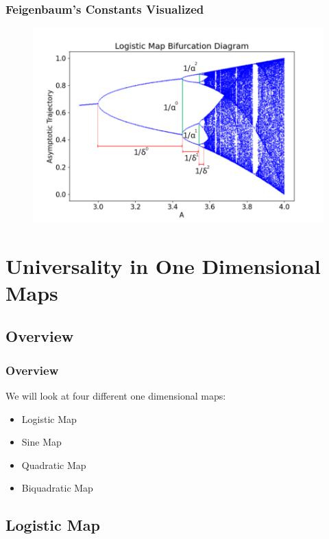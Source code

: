 \documentclass[
	11pt, %
	aspectratio=169, %
]{beamer}
\begin{document}

\begin{frame}
	\frametitle{Feigenbaum's Constants Visualized}
    \begin{figure}
        \includegraphics[width=0.6\linewidth]{plots/feigenbaum_constants_example.png}
    \end{figure}
\end{frame}


\section{Universality in One Dimensional Maps}
\subsection{Overview}

\begin{frame}
	\frametitle{Overview}

    We will look at four different one dimensional maps: \pause

    \begin{itemize}
        \item Logistic Map \pause
        \item Sine Map \pause
        \item Quadratic Map \pause
        \item Biquadratic Map
    \end{itemize}

\end{frame}


\subsection{Logistic Map}
\end{document}
